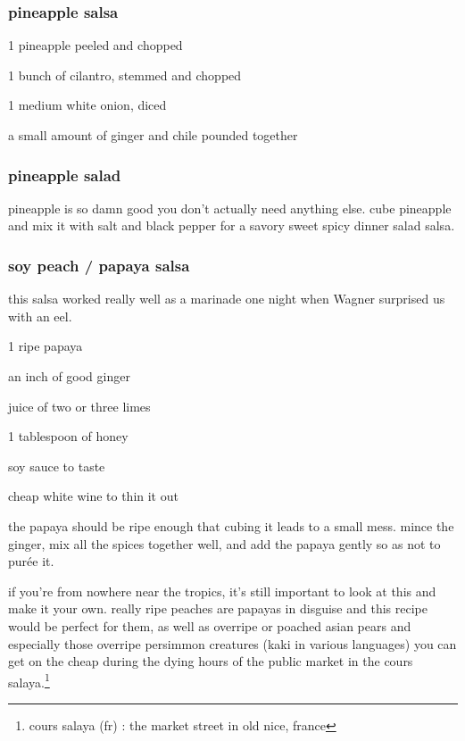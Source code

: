 \subsubsection{pineapple salsa}

\begin{ingredients}
  \item 1 pineapple peeled and chopped
  \item 1 bunch of cilantro, stemmed and chopped
  \item 1 medium white onion, diced
  \item a small amount of ginger and chile pounded together
\end{ingredients}

\subsubsection{pineapple salad}

pineapple is so damn good you don't actually need anything else. cube
pineapple and mix it with salt and black pepper for a savory sweet
spicy dinner salad salsa.

\subsubsection{soy peach / papaya salsa}

this salsa worked really well as a marinade one night when Wagner
surprised us with an eel.

\begin{ingredients}
  \item 1 ripe papaya
  \item an inch of good ginger
  \item juice of two or three limes
  \item 1 tablespoon of honey
  \item soy sauce to taste
  \item cheap white wine to thin it out
\end{ingredients}

the papaya should be ripe enough that cubing it leads to a small
mess. mince the ginger, mix all the spices together well, and add the
papaya gently so as not to pur\'{e}e it.

if you're from nowhere near the tropics, it's still important to look
at this and make it your own. really ripe peaches are papayas in
disguise and this recipe would be perfect for them, as well as
overripe or poached asian pears and especially those overripe
persimmon creatures (kaki in various languages) you can get on the
cheap during the dying hours of the public market in the cours
salaya.\footnote{cours salaya (fr) : the market street in old nice,
france}

